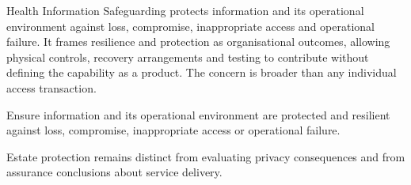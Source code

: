 Health Information Safeguarding protects information and its operational environment against loss, compromise, inappropriate access and operational failure. It frames resilience and protection as organisational outcomes, allowing physical controls, recovery arrangements and testing to contribute without defining the capability as a product. The concern is broader than any individual access transaction.



Ensure information and its operational environment are protected and resilient against loss, compromise, inappropriate access or operational failure.



Estate protection remains distinct from evaluating privacy consequences and from assurance conclusions about service delivery.


